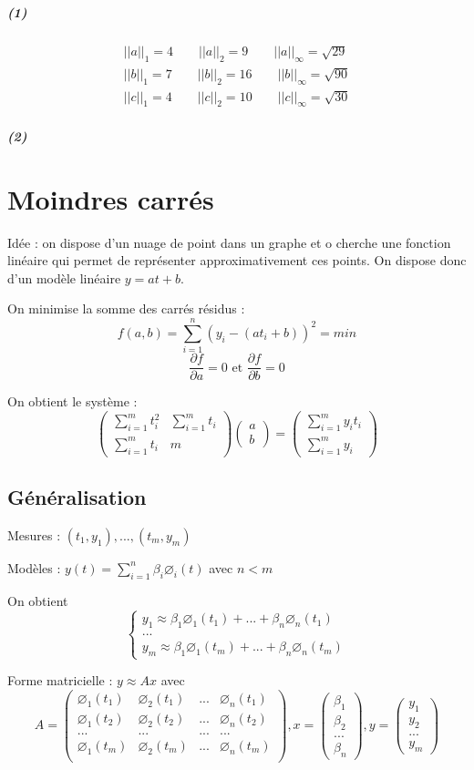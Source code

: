 \documentclass[11pt,a4paper]{report}
\newcommand{\matd}[4]{\begin{pmatrix}#1 & #2 \\ #3 & #4\end{pmatrix}}
\newcommand{\matdd}[2]{\begin{pmatrix}#1 \\ #2\end{pmatrix}}
\newcommand{\matdddd}[4]{\begin{pmatrix}#1\\#2\\#3\\#4\end{pmatrix}}
\newcommand{\matnnn}[3]{\begin{matrix}#1 \\ #2 \\ #3\end{matrix}}
\newcommand{\partderiv}[2]{\frac{\partial #1}{\partial #2}}
\newcommand{\normun}[1]{||#1||_1}
\newcommand{\normdeux}[1]{||#1||_2}
\newcommand{\norminf}[1]{||#1||_{\infty}}
\begin{document}
\paragraph*{(1)}
\begin{align*}
\normun{a} = 4 \qquad \normdeux{a} = 9 \qquad \norminf{a} = \sqrt{29}\\
\normun{b} = 7 \qquad \normdeux{b} = 16 \qquad \norminf{b} = \sqrt{90}\\
\normun{c} = 4 \qquad \normdeux{c} = 10 \qquad \norminf{c} = \sqrt{30}
\end{align*}

\paragraph*{(2)}

\chapter{Moindres carrés}

Idée : on dispose d'un nuage de point dans un graphe et o cherche une fonction linéaire qui permet de représenter approximativement ces points. On dispose donc d'un modèle linéaire $y = at + b$.

On minimise la somme des carrés résidus :
$$ f(a,b) = \sum_{i=1}^n(y_i-(at_i+b))^2 = min $$
$$ \partderiv{f}{a} = 0 \text{ et } \partderiv{f}{b} = 0 $$

On obtient le système :
$$
\matd{\sum_{i=1}^m t_i^2}{\sum_{i=1}^m t_i}{\sum_{i=1}^m t_i}{m} \matdd{a}{b} =
\matdd{\sum_{i=1}^m y_it_i}{\sum_{i=1}^m y_i}
$$

\section{Généralisation}

Mesures : $(t_1,y_1),...,(t_m,y_m)$

Modèles : $y(t) = \sum_{i=1}^n \beta_i\varnothing_i(t)$ avec $n < m$

On obtient
$$
\left\lbrace
\matnnn{y_1 \approx \beta_1\varnothing_1(t_1) + ... + \beta_n\varnothing_n(t_1)}
       {...}
       {y_m \approx \beta_1\varnothing_1(t_m) + ... + \beta_n\varnothing_n(t_m)}
\right.
$$

Forme matricielle : $y \approx Ax$ avec 
$$
A =
\begin{pmatrix}
\varnothing_1(t_1) & \varnothing_2(t_1) & ... & \varnothing_n(t_1) \\
\varnothing_1(t_2) & \varnothing_2(t_2) & ... & \varnothing_n(t_2) \\
... & ... & ... & ... \\
\varnothing_1(t_m) & \varnothing_2(t_m) & ... & \varnothing_n(t_m) \\
\end{pmatrix} ,
x = \matdddd{\beta_1}{\beta_2}{...}{\beta_n},
y = \matdddd{y_1}{y_2}{...}{y_m}
$$
\end{document}
